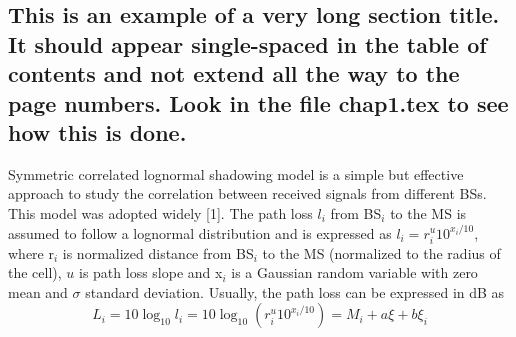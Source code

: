 \subsection[This is an example of a very long section title.  It should\protect \vspace{-2ex}\\ appear single-spaced in the table of contents and not
\protect \vspace{-2ex} \\ extend all the way to the page numbers.  Look in the\protect \vspace{-2ex} \\file chap1.tex to see how this is done.]
{This is an example of a very long section title.  It should appear single-spaced in the table of contents and not extend all the way to the page numbers.  Look in the file chap1.tex to see how this is done.}
Symmetric correlated lognormal shadowing model is a simple but
effective approach to study the correlation between received
signals from different BSs. This model was adopted widely [1]. The
path loss $l_i$ from BS$_{i}$ to the MS is assumed to follow a
lognormal distribution and is expressed as $l_i = r_i^u 10^{x_i /
10}$, where r$_{i}$ is normalized distance from BS$_{i}$ to the MS
(normalized to the radius of the cell), $u$ is path loss slope and
x$_{i}$ is a Gaussian random variable with zero mean and $\sigma$
standard deviation. Usually, the path loss can be expressed in dB
as
\begin{equation}
\label{eqrawcon:1} L_i=10\log _{10} l_i = 10\log _{10} (r_i^u
10^{x_i / 10}) = M_i + a\xi + b\xi _i
\end{equation}

